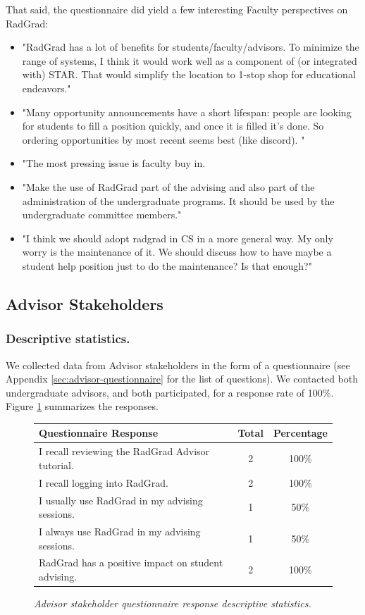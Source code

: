 \documentclass[acmsmall,nonacm]{acmart}
\begin{document}
That said, the questionnaire did yield a few interesting Faculty perspectives on RadGrad:

\begin{itemize}[leftmargin=*]
\item "RadGrad has a lot of benefits for students/faculty/advisors. To minimize the range of systems, I think it would work well as a component of (or integrated with) STAR. That would simplify the location to 1-stop shop for educational endeavors."
\item "Many opportunity announcements have a short lifespan: people are looking for students to fill a position quickly, and once it is filled it's done. So ordering opportunities by most recent seems best (like discord). "
\item "The most pressing issue is faculty buy in.
\item "Make the use of RadGrad part of the advising and also part of the administration of the undergraduate programs. It should be used by the undergraduate committee members."
\item "I think we should adopt radgrad in CS in a more general way. My only worry is the maintenance of it. We should discuss how to have maybe a student help position just to do the maintenance? Is that enough?"
\end{itemize}

\subsection{Advisor Stakeholders}

\subsubsection{Descriptive statistics.} We collected data from Advisor stakeholders in the form of a questionnaire (see Appendix \ref{sec:advisor-questionnaire} for the list of questions). We contacted both undergraduate advisors, and both participated, for a response rate of 100\%.  Figure \ref{fig:advisor-questionnaire-responses} summarizes the responses.

\begin{figure}[th]
\centering
\small
\begin{tabular}{ p{4in} c c }
\hline
 Questionnaire Response &  Total & Percentage   \\
\hline
I recall reviewing the RadGrad Advisor tutorial. & 2 & 100\% \\
I recall logging into RadGrad.                   & 2 & 100\% \\
I usually use RadGrad in my advising sessions.  & 1 & 50\% \\
I always use RadGrad in my advising sessions.  & 1 & 50\% \\
RadGrad has a positive impact on student advising.  & 2 & 100\% \\
\hline
\end{tabular}
\caption{\em Advisor stakeholder questionnaire response descriptive statistics.}
\normalsize
\label{fig:advisor-questionnaire-responses}
\end{figure}
\end{document}

